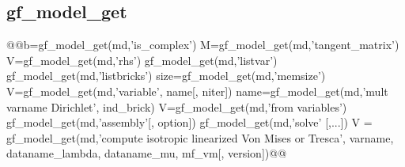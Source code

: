 \subsection{gf\_model_get}
\begin{synopsis}
@@b=gf_model_get(md,'is_complex')
M=gf_model_get(md,'tangent_matrix')
V=gf_model_get(md,'rhs')
gf_model_get(md,'listvar')
gf_model_get(md,'listbricks')
size=gf_model_get(md,'memsize')
V=gf_model_get(md,'variable', \tstr name[, \tint niter])
name=gf_model_get(md,'mult varname Dirichlet', \tint ind_brick)
V=gf_model_get(md,'from variables')
gf_model_get(md,'assembly'[, \tstr option])
gf_model_get(md,'solve' [,...])
V = gf_model_get(md,'compute isotropic linearized Von Mises or Tresca', \tstr varname, \tstr dataname_lambda, \tstr dataname_mu, \tmf mf_vm[, \tstr version])@@
\end{synopsis}
